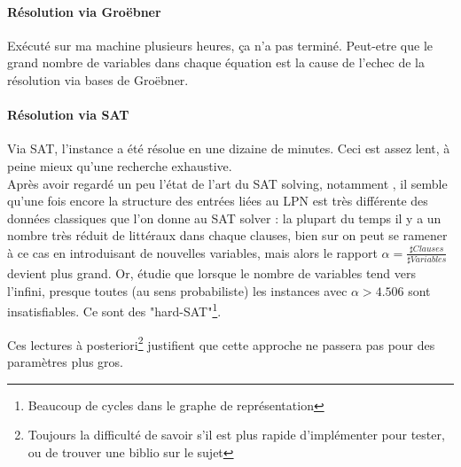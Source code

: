 \documentclass{article}		%
\theoremstyle{definition}
\theoremstyle{plain}
\begin{document}
\paragraph{Résolution via Groëbner}
Exécuté sur ma machine plusieurs heures, ça n'a pas terminé. Peut-etre 
que le grand nombre de variables dans chaque équation est la cause de
l'echec de la résolution via
bases de Groëbner.
\paragraph{Résolution via SAT}
Via SAT, l'instance a été résolue en une dizaine de minutes. Ceci est
assez lent, à peine mieux qu'une recherche exhaustive. 
\\
Après avoir regardé
un peu l'état de l'art du SAT solving, notamment \cite{Mezard}, il semble qu'une fois encore la
structure des entrées liées au LPN est très différente des données
classiques que l'on donne au SAT solver : la plupart du temps il y a un
nombre très réduit de littéraux dans chaque clauses, bien sur on peut se
ramener à ce cas en introduisant de nouvelles variables, mais alors le
rapport $\alpha=\frac {\sharp Clauses}{\sharp Variables}$ devient plus grand.
Or, \cite{Dubois} étudie que lorsque le nombre de variables tend vers
l'infini, presque toutes (au sens probabiliste) les
instances avec $\alpha > 4.506$ sont insatisfiables. Ce sont des
"hard-SAT"\footnote{Beaucoup de cycles dans le graphe de représentation}.

Ces lectures à posteriori\footnote{Toujours la difficulté de savoir s'il
est plus rapide d'implémenter pour tester, ou de trouver une biblio sur
le sujet} justifient que cette approche ne passera pas pour
des paramètres plus gros. 
\end{document}
